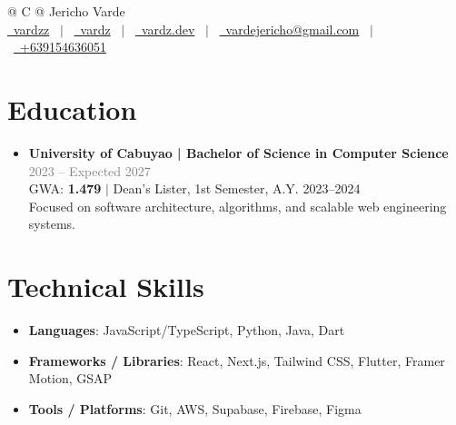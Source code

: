 \documentclass[a4paper,10pt]{article}
\newenvironment{compactlist}
    {
    \begin{itemize}[nosep,after=\strut, leftmargin=1em, itemsep=2pt, label=\textbullet]
    }
    {
    \end{itemize}
    }
\begin{document}
\pagestyle{empty} 


\begin{tabularx}{\linewidth}{@{} C @{}}
\Huge{Jericho Varde} \\[4pt]
\href{https://github.com/vardzz}{\raisebox{-0.05\height}\faGithub\ vardzz} \ $|$ \ 
\href{https://linkedin.com/in/vardz}{\raisebox{-0.05\height}\faLinkedin\ vardz} \ $|$ \ 
\href{https://www.vardz.dev/}{\raisebox{-0.05\height}\faGlobe \ vardz.dev} \ $|$ \ 
\href{mailto:vardejericho@gmail.com}{\raisebox{-0.05\height}\faEnvelope \ vardejericho@gmail.com} \ $|$ \ 
\href{tel:+639154636051}{\raisebox{-0.05\height}\faMobile \ +639154636051} \\
\end{tabularx}

\section{Education}
\begin{compactlist}
\item \textbf{University of Cabuyao | Bachelor of Science in Computer Science} \hfill \textcolor{gray}{2023 -- Expected 2027} \\
GWA: \textbf{1.479} $|$ Dean's Lister, 1st Semester, A.Y. 2023--2024 \\
Focused on software architecture, algorithms, and scalable web engineering systems.
\end{compactlist}

\section{Technical Skills}
\begin{compactlist}
\item \textbf{Languages}: JavaScript/TypeScript, Python, Java, Dart
\item \textbf{Frameworks / Libraries}: React, Next.js, Tailwind CSS, Flutter, Framer Motion, GSAP
\item \textbf{Tools / Platforms}: Git, AWS, Supabase, Firebase, Figma
\end{compactlist}
\end{document}
